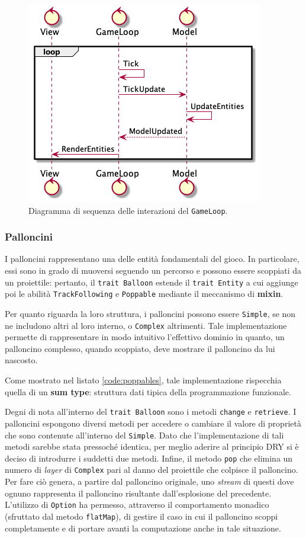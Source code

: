 \begin{figure}[H]
    \centering
    \includegraphics[width=.5\linewidth]{img/sequence-gameloop}
    \caption{Diagramma di sequenza delle interazioni del \texttt{GameLoop}.}
    \label{fig:sequence-gameloop}
\end{figure}

\subsubsection{Palloncini}
I palloncini rappresentano una delle entità fondamentali del gioco. In particolare, essi sono in grado di muoversi
seguendo un percorso e possono essere scoppiati da un proiettile: pertanto, il \texttt{trait Balloon} estende il
\texttt{trait Entity} a cui aggiunge poi le abilità \texttt{TrackFollowing} e \texttt{Poppable} mediante il meccanismo
di \textbf{mixin}.

Per quanto riguarda la loro struttura, i palloncini possono essere \texttt{Simple}, se non ne includono altri al loro
interno, o \texttt{Complex} altrimenti. Tale implementazione permette di rappresentare in modo intuitivo l'effettivo
dominio in quanto, un palloncino complesso, quando scoppiato, deve mostrare il palloncino da lui nascosto.



Come mostrato nel listato \ref{code:poppables}, tale implementazione rispecchia quella di un \textbf{sum type}: struttura
dati tipica della programmazione funzionale.

Degni di nota all'interno del \texttt{trait Balloon} sono i metodi \texttt{change} e \texttt{retrieve}. I palloncini
espongono diversi metodi per accedere o cambiare il valore di proprietà che sono contenute all'interno del
\texttt{Simple}. Dato che l'implementazione di tali metodi sarebbe stata pressoché identica, per meglio aderire al
principio DRY si è deciso di introdurre i suddetti due metodi.
Infine, il metodo \texttt{pop} che elimina un numero di \textit{layer} di \texttt{Complex} pari al danno del proiettile
che colpisce il palloncino. Per fare ciò genera, a partire dal palloncino originale, uno \textit{stream} di questi dove
ognuno rappresenta il palloncino risultante dall'esplosione del precedente. L'utilizzo di \texttt{Option} ha permesso,
attraverso il comportamento monadico (sfruttato dal metodo \texttt{flatMap}), di gestire il caso in cui il palloncino
scoppi completamente e di portare avanti la computazione anche in tale situazione.

